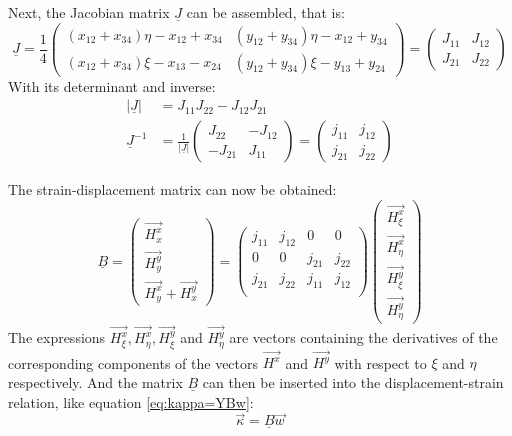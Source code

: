   Next, the Jacobian matrix $\underline{J}$ can be assembled, that is:
  \begin{equation}
  \underline{J} = \frac{1}{4} \begin{pmatrix}
  (x_{12}+x_{34})\eta - x_{12} + x_{34} & (y_{12} + y_{34})\eta - x_{12} + y_{34}\\
  (x_{12}+x_{34})\xi  - x_{13} - x_{24} & (y_{12} + y_{34})\xi  - y_{13} + y_{24}
  \end{pmatrix} = \begin{pmatrix}
  J_{11} & J_{12}\\ J_{21} & J_{22}
  \end{pmatrix}
  \end{equation}
  With its determinant and inverse:
  \begin{align}
  \left|\underline{J}\right| &= J_{11} J_{22} - J_{12} J_{21}\\
  \underline{J}^{-1} &= \frac{1}{\left|\underline{J}\right|} \begin{pmatrix}
  J_{22} & -J_{12}\\ -J_{21} & J_{11}
  \end{pmatrix} = \begin{pmatrix}
  j_{11} & j_{12}\\ j_{21} & j_{22}
  \end{pmatrix}
  \end{align}
  
  The strain-displacement matrix can now be obtained:
  \begin{equation}
  \underline{B} = \begin{pmatrix}
  \vec{H_x^x}\\\vec{H_y^y}\\\vec{H_y^x}+\vec{H_x^y}
  \end{pmatrix} = \begin{pmatrix}
  j_{11} & j_{12} & 0 & 0\\
  0 & 0 & j_{21} & j_{22}\\
  j_{21} & j_{22} & j_{11} & j_{12}\\
  \end{pmatrix} \begin{pmatrix}
  \vec{H_\xi^x}\\\vec{H_\eta^x}\\\vec{H_\xi^y}\\\vec{H_\eta^y}
  \end{pmatrix}
  \end{equation}
  The expressions $\vec{H_\xi^x}, \vec{H_\eta^x}, \vec{H_\xi^y}$ and $\vec{H_\eta^y}$ are vectors containing the derivatives of the corresponding components of the vectors $\vec{H^x}$ and $\vec{H^y}$ with respect to $\xi$ and $\eta$ respectively.
  And the matrix $\underline{B}$ can then be inserted into the displacement-strain relation, like equation \eqref{eq:kappa=YBw}:
  \begin{equation}
  \vec{\kappa} = \underline{B} \vec{w}
  \end{equation}
  

